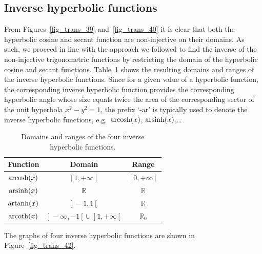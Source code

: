 \subsection{Inverse hyperbolic functions}
From Figures~\ref{fig_trans_39} and~\ref{fig_trans_40}  it is clear that both the hyperbolic cosine and secant function are non-injective on their domains. As such, we proceed in line with the approach we followed to find the inverse of the non-injective trigonometric functions by restricting the domain of the hyperbolic cosine and secant functions. Table~\ref{tab_trans_5} shows the resulting  domains and ranges of the inverse hyperbolic functions. Since for a given value of a hyperbolic function, the corresponding inverse hyperbolic function provides the corresponding hyperbolic angle whose size equals twice the area of the corresponding sector of the unit hyperbola $x^2 - y^2 = 1$, the prefix `-ar' is typically used to denote the inverse hyperbolic functions, e.g.\ $\operatorname{arcosh}(x)$, $\operatorname{arsinh}(x)$,\ldots 


\begin{table}[h]
\caption{Domains and ranges of the four inverse hyperbolic functions.}
\label{tab_trans_5}
\begin{tabular}{c|cc}
Function & Domain & Range\\ \hline\hline
$\operatorname{arcosh}(x)$ & $\left[\right.1,+\infty\left[\right.$& $\left[\right.0,+\infty\left[\right.$ \\
$\operatorname{arsinh}(x)$ &  $\mathbb{R}$& $\mathbb{R}$ \\
$\operatorname{artanh}(x)$ & $\left.\right]-1,1\left[\right.$ & $\mathbb{R}$ \\
$\operatorname{arcoth}(x)$ & $\left.\right]-\infty,-1\left[\right.\cup \left.\right]1,+\infty\left[\right.$& $\mathbb{R}_0$ \\
\hline\hline
\end{tabular}
\end{table}


The graphs of four inverse hyperbolic functions are shown in Figure~\ref{fig_trans_42}.

